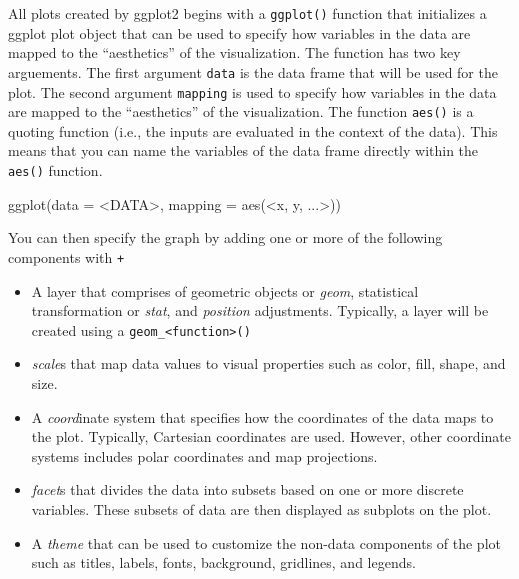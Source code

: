 \documentclass[
]{book}
\newenvironment{Shaded}{\begin{snugshade}}{\end{snugshade}}
\newcommand{\AttributeTok}[1]{\textcolor[rgb]{0.77,0.63,0.00}{#1}}
\newcommand{\FunctionTok}[1]{\textcolor[rgb]{0.00,0.00,0.00}{#1}}
\newcommand{\NormalTok}[1]{#1}
\newcommand{\SpecialCharTok}[1]{\textcolor[rgb]{0.00,0.00,0.00}{#1}}
\providecommand{\tightlist}{%
  \setlength{\itemsep}{0pt}\setlength{\parskip}{0pt}}
\begin{document}
All plots created by ggplot2 begins with a \texttt{ggplot()} function that initializes a ggplot plot object that can be used to specify how variables in the data are mapped to the ``aesthetics'' of the visualization. The function has two key arguements. The first argument \texttt{data} is the data frame that will be used for the plot. The second argument \texttt{mapping} is used to specify how variables in the data are mapped to the ``aesthetics'' of the visualization. The function \texttt{aes()} is a quoting function (i.e., the inputs are evaluated in the context of the data). This means that you can name the variables of the data frame directly within the \texttt{aes()} function.

\begin{Shaded}
\begin{Highlighting}[]
\FunctionTok{ggplot}\NormalTok{(}\AttributeTok{data =} \SpecialCharTok{\textless{}}\NormalTok{DATA}\SpecialCharTok{\textgreater{}}\NormalTok{, }\AttributeTok{mapping =} \FunctionTok{aes}\NormalTok{(}\SpecialCharTok{\textless{}}\NormalTok{x, y, ...}\SpecialCharTok{\textgreater{}}\NormalTok{))}
\end{Highlighting}
\end{Shaded}

You can then specify the graph by adding one or more of the following components with \texttt{+}

\begin{itemize}
\tightlist
\item
  A layer that comprises of geometric objects or \emph{geom}, statistical transformation or \emph{stat}, and \emph{position} adjustments. Typically, a layer will be created using a \texttt{geom\_\textless{}function\textgreater{}()}
\item
  \emph{scale}s that map data values to visual properties such as color, fill, shape, and size.
\item
  A \emph{coord}inate system that specifies how the coordinates of the data maps to the plot. Typically, Cartesian coordinates are used. However, other coordinate systems includes polar coordinates and map projections.
\item
  \emph{facet}s that divides the data into subsets based on one or more discrete variables. These subsets of data are then displayed as subplots on the plot.
\item
  A \emph{theme} that can be used to customize the non-data components of the plot such as titles, labels, fonts, background, gridlines, and legends.
\end{itemize}
\end{document}

